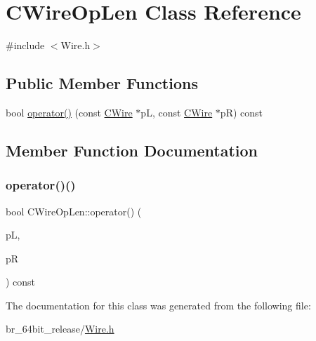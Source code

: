\hypertarget{classCWireOpLen}{}\section{C\+Wire\+Op\+Len Class Reference}
\label{classCWireOpLen}


{\ttfamily \#include $<$Wire.\+h$>$}

\subsection*{Public Member Functions}
\begin{DoxyCompactItemize}
\item 
bool \mbox{\hyperlink{classCWireOpLen_ae845b478fcf2c1c5551b4bca3664b5e9}{operator()}} (const \mbox{\hyperlink{classCWire}{C\+Wire}} $\ast$pL, const \mbox{\hyperlink{classCWire}{C\+Wire}} $\ast$pR) const
\end{DoxyCompactItemize}


\subsection{Member Function Documentation}
\mbox{\label{classCWireOpLen_ae845b478fcf2c1c5551b4bca3664b5e9}} 
\subsubsection{\texorpdfstring{operator()()}{operator()()}}
{\footnotesize\ttfamily bool C\+Wire\+Op\+Len\+::operator() (\begin{DoxyParamCaption}\item[{const \mbox{\hyperlink{classCWire}{C\+Wire}} $\ast$}]{pL,  }\item[{const \mbox{\hyperlink{classCWire}{C\+Wire}} $\ast$}]{pR }\end{DoxyParamCaption}) const\hspace{0.3cm}{\ttfamily [inline]}}



The documentation for this class was generated from the following file\+:\begin{DoxyCompactItemize}
\item 
br\+\_\+64bit\+\_\+release/\mbox{\hyperlink{Wire_8h}{Wire.\+h}}\end{DoxyCompactItemize}
